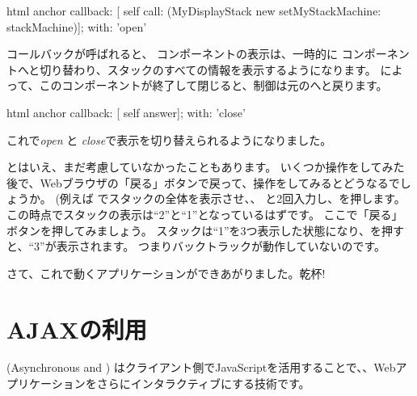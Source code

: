 \documentclass[a4paper,10pt,twoside]{book}
\begin{document}
\begin{code}{}
html anchor
	callback: [ self call: (MyDisplayStack new setMyStackMachine: stackMachine)];
	with: 'open'
\end{code}


コールバックが呼ばれると、 コンポーネントの表示は、一時的に コンポーネントへと切り替わり、スタックのすべての情報を表示するようになります。
によって、このコンポーネントが終了して閉じると、制御は元のへと戻ります。


\begin{code}{}
html anchor
	callback: [ self answer];
	with: 'close'
\end{code}

これで\emph{open} と \emph{close}で表示を切り替えられるようになりました。

とはいえ、まだ考慮していなかったこともあります。
いくつか操作をしてみた後で、Webブラウザの「戻る」ボタンで戻って、操作をしてみるとどうなるでしょうか。
(例えば でスタックの全体を表示させ、、 と2回入力し、\menu {+}を押します。
この時点でスタックの表示は``2''と``1''となっているはずです。
ここで「戻る」ボタンを押してみましょう。
スタックは``1''を3つ表示した状態になり、\menu {+}を押すと、``3''が表示されます。
つまりバックトラックが動作していないのです。


さて、これで動くアプリケーションができあがりました。乾杯!

\section{AJAXの利用}


 (Asynchronous  and ) はクライアント側でJavaScriptを活用することで、、Webアプリケーションをさらにインタラクティブにする技術です。
\end{document}
